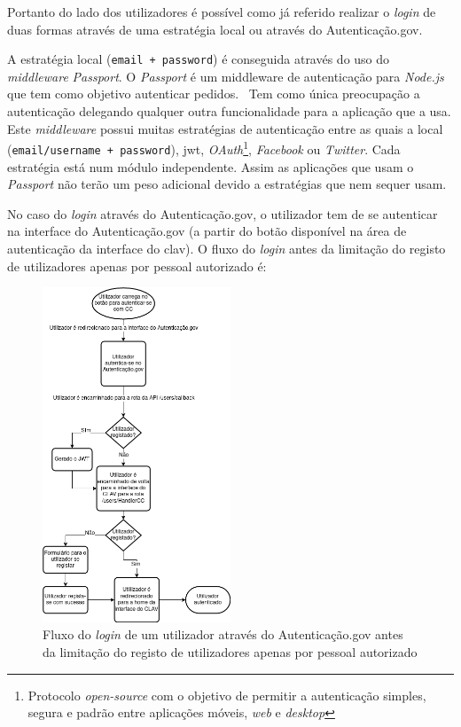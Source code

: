 Portanto do lado dos utilizadores é possível como já referido realizar o \textit{login} de duas formas através de uma estratégia local ou através do Autenticação.gov.

A estratégia local (\texttt{email + password}) é conseguida através do uso do \textit{middleware} \textit{Passport}.
O \textit{Passport} é um middleware de autenticação para \textit{Node.js} que tem como objetivo autenticar pedidos.~\cite{passport} Tem como única preocupação a autenticação delegando qualquer outra funcionalidade para a aplicação que a usa. Este \textit{middleware} possui muitas estratégias de autenticação entre as quais a local (\texttt{email/username + password}), \acrshort{jwt}, \textit{OAuth}\footnote{Protocolo \textit{open-source} com o objetivo de permitir a autenticação simples, segura e padrão entre aplicações móveis, \textit{web} e \textit{desktop}}, \textit{Facebook} ou \textit{Twitter}. Cada estratégia está num módulo independente. Assim as aplicações que usam o \textit{Passport} não terão um peso adicional devido a estratégias que nem sequer usam.

No caso do \textit{login} através do Autenticação.gov, o utilizador tem de se autenticar na interface do Autenticação.gov (a partir do botão disponível na área de autenticação da interface do \acrshort{clav}). O fluxo do \textit{login} antes da limitação do registo de utilizadores apenas por pessoal autorizado é:

\begin{figure}[H]
    \begin{center}
        \includegraphics[width=0.5\textwidth]{img/authgov.png}
    \end{center}
    \caption{Fluxo do \textit{login} de um utilizador através do Autenticação.gov antes da limitação do registo de utilizadores apenas por pessoal autorizado}\label{fig:authgov}
\end{figure}

